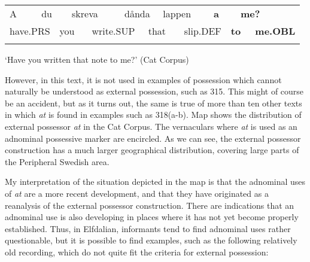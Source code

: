 \begin{tabular}{llllllllllllll}
\lsptoprule
A & \multicolumn{2}{l}{du

} & \multicolumn{2}{l}{skreva

} & \multicolumn{2}{l}{dånda

} & \multicolumn{2}{l}{lappen

} & \multicolumn{2}{l}{{\bfseries a}

} & \multicolumn{2}{l}{{\bfseries me?}

} & \\
\multicolumn{2}{l}{have.PRS

} & \multicolumn{2}{l}{you

} & \multicolumn{2}{l}{write.SUP

} & \multicolumn{2}{l}{that

} & \multicolumn{2}{l}{slip.DEF

} & \multicolumn{2}{l}{{\bfseries to}

} & \multicolumn{2}{l}{{\bfseries me.OBL}

}\\
\lspbottomrule
\end{tabular}

\begin{styleTranslation}
‘Have you written that note to me?’ (Cat Corpus)

\end{styleTranslation}

\begin{styleBodyTextFirst}
However, in this text, it is not used in examples of possession which cannot naturally be understood as external possession, such as 315. This might of course be an accident, but as it turns out, the same is true of more than ten other texts in which \textit{at} is found in examples such as 318(a-b). Map  shows the distribution of external possessor \textit{at} in the Cat Corpus. The vernaculars where \textit{at} is used as an adnominal possessive marker are encircled. As we can see, the external possessor construction has a much larger geographical distribution, covering large parts of the Peripheral Swedish area. 

\end{styleBodyTextFirst}

\begin{styleBodytextC}
My interpretation of the situation depicted in the map is that the adnominal uses of \textit{at }are a more recent development, and that they have originated as a reanalysis of the external possessor construction. There are indications that an adnominal use is also developing in places where it has not yet become properly established. Thus, in Elfdalian, informants tend to find adnominal uses rather questionable, but it is possible to find examples, such as the following relatively old recording, which do not quite fit the criteria for external possession: 

\end{styleBodytextC}

